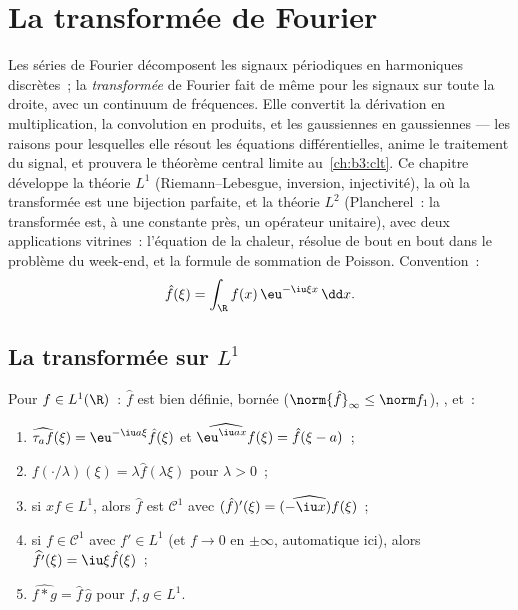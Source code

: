 \chapter{La transformée de Fourier}\label{ch:b3:fouriertransform}

Les séries de Fourier décomposent les signaux périodiques en
harmoniques discrètes~; la \emph{transformée} de Fourier fait
de même pour les signaux sur toute la droite, avec un continuum
de fréquences. Elle convertit la dérivation en multiplication,
la convolution en produits, et les gaussiennes en gaussiennes
--- les raisons pour lesquelles elle résout les équations
différentielles, anime le traitement du signal, et prouvera le
théorème central limite au~\cref{ch:b3:clt}. Ce chapitre
développe la théorie $L^1$ (Riemann--Lebesgue, inversion,
injectivité), la  où la transformée est une
bijection parfaite, et la théorie $L^2$ (Plancherel~: la
transformée est, à une constante près, un opérateur unitaire),
avec deux applications vitrines~: l'équation de la chaleur,
résolue de bout en bout dans le problème du week-end, et la
formule de sommation de Poisson. Convention~:
\[
\hat f(\xi) = \int_\R f(x)\,\eu^{-\iu\xi x}\,\dd x .
\]

\section{La transformée sur \texorpdfstring{$L^1$}{L1}}

\begin{proposition}\label{prop:b3:fouriertransform:basic}
Pour $f \in L^1(\R)$~: $\hat f$ est bien définie, bornée
($\norm{\hat f}_\infty \leq \norm f_1$), , et~:
\begin{enumerate}
  \item $\widehat{\tau_af}(\xi) = \eu^{-\iu a\xi}\hat f(\xi)$
        et $\widehat{\eu^{\iu ax}f}(\xi) = \hat f(\xi - a)$~;
  \item $\widehat{f(\cdot/\lambda)}(\xi) = \lambda\hat
        f(\lambda\xi)$ pour $\lambda > 0$~;
  \item si $xf \in L^1$, alors $\hat f$ est $\mathcal C^1$ avec
        $(\hat f)'(\xi) = \widehat{(-\iu x)f}(\xi)$~;
  \item si $f \in \mathcal C^1$ avec $f' \in L^1$ (et $f \to
        0$ en $\pm\infty$, automatique ici), alors
        $\widehat{f'}(\xi) = \iu\xi\hat f(\xi)$~;
  \item $\widehat{f * g} = \hat f\,\hat g$ pour $f, g \in L^1$.
\end{enumerate}
\end{proposition}

